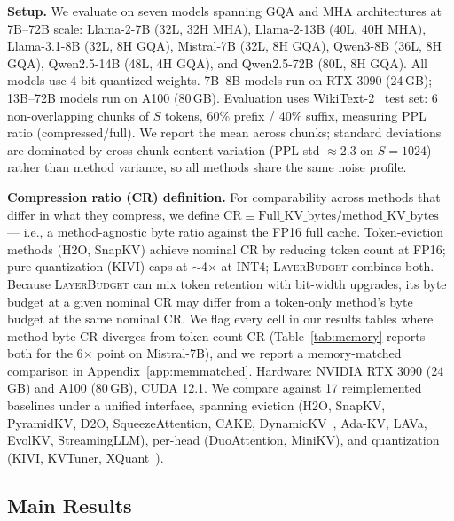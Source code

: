 \documentclass{article}
\newcommand{\layerbudget}{\textsc{LayerBudget}\xspace}
\begin{document}
\textbf{Setup.}
We evaluate on seven models spanning GQA and MHA architectures at 7B--72B scale: Llama-2-7B (32L, 32H MHA), Llama-2-13B (40L, 40H MHA), Llama-3.1-8B (32L, 8H GQA), Mistral-7B (32L, 8H GQA), Qwen3-8B (36L, 8H GQA), Qwen2.5-14B (48L, 4H GQA), and Qwen2.5-72B (80L, 8H GQA).
All models use 4-bit quantized weights.
7B--8B models run on RTX 3090 (24\,GB); 13B--72B models run on A100 (80\,GB).
Evaluation uses WikiText-2~\citep{merity2017wikitext} test set: 6 non-overlapping chunks of $S$ tokens, 60\% prefix / 40\% suffix, measuring PPL ratio (compressed/full).
We report the mean across chunks; standard deviations are dominated by cross-chunk content variation (PPL std $\approx$2.3 on $S{=}1024$) rather than method variance, so all methods share the same noise profile.

\textbf{Compression ratio (CR) definition.}
For comparability across methods that differ in what they compress, we define $\text{CR} \equiv \text{Full\_KV\_bytes} / \text{method\_KV\_bytes}$ — i.e., a method-agnostic byte ratio against the FP16 full cache.
Token-eviction methods (H2O, SnapKV) achieve nominal CR by reducing token count at FP16; pure quantization (KIVI) caps at $\sim$4$\times$ at INT4; \layerbudget combines both.
Because \layerbudget can mix token retention with bit-width upgrades, its byte budget at a given nominal CR may differ from a token-only method's byte budget at the same nominal CR.
We flag every cell in our results tables where method-byte CR diverges from token-count CR (Table~\ref{tab:memory} reports both for the 6$\times$ point on Mistral-7B), and we report a memory-matched comparison in Appendix~\ref{app:memmatched}.
Hardware: NVIDIA RTX 3090 (24\,GB) and A100 (80\,GB), CUDA 12.1.
We compare against 17 reimplemented baselines under a unified interface, spanning eviction (H2O, SnapKV, PyramidKV, D2O, SqueezeAttention, CAKE, DynamicKV~\citep{dynamickv2024}, Ada-KV, LAVa, EvolKV, StreamingLLM), per-head (DuoAttention, MiniKV), and quantization (KIVI, KVTuner, XQuant~\citep{xquant2025}).

\subsection{Main Results}
\end{document}
